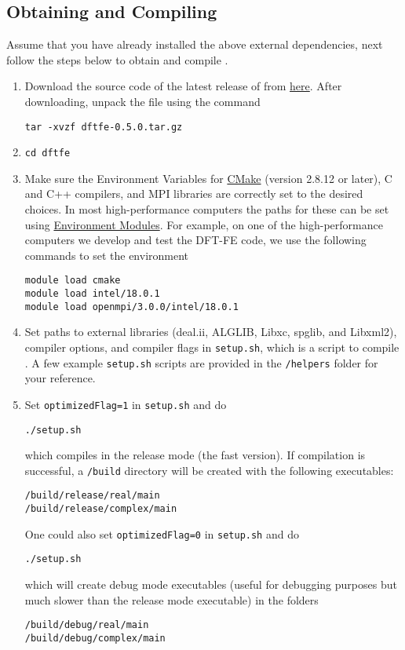 \subsection{Obtaining and Compiling \dftfe{}}
Assume that you have already installed the above external dependencies, next follow the steps below to obtain and compile \dftfe{}.
\begin{enumerate}
\item Download the source code of the latest release of \dftfe{} from \href{wesbite}{here}. After downloading, unpack the file using the command
\begin{verbatim}
tar -xvzf dftfe-0.5.0.tar.gz
\end{verbatim}

\item   \begin{verbatim}
cd dftfe
\end{verbatim}


\item Make sure the Environment Variables for \href{http://www.cmake.org/}{CMake} (version 2.8.12 or later), C and C++ compilers, and MPI libraries are correctly set to the desired choices. In most high-performance computers the paths for these can be set using \href{http://modules.sourceforge.net/}{Environment Modules}. For example, on one of the high-performance computers we develop and test the DFT-FE code, we use the following commands to set the environment
\begin{verbatim}
module load cmake
module load intel/18.0.1
module load openmpi/3.0.0/intel/18.0.1
\end{verbatim}

\item Set paths to external libraries (deal.ii, ALGLIB, Libxc, spglib, and Libxml2), compiler options, and compiler flags in \verb|setup.sh|, which is a script to compile \dftfe{}. A few example \verb|setup.sh| scripts are provided in the \verb|/helpers| folder for your reference. 

\item Set \verb|optimizedFlag=1| in \verb|setup.sh| and do
\begin{verbatim}
./setup.sh
\end{verbatim} 
which compiles \dftfe{} in the release mode (the fast version). If compilation is successful, a \verb|/build| directory will be created with the following executables:
\begin{verbatim}
/build/release/real/main
/build/release/complex/main
\end{verbatim}
One could also set \verb|optimizedFlag=0| in \verb|setup.sh| and do
\begin{verbatim}
./setup.sh
\end{verbatim}
which will create debug mode executables (useful for debugging purposes but much slower than the release mode executable) in the folders
\begin{verbatim}
/build/debug/real/main
/build/debug/complex/main
\end{verbatim}
\end{enumerate}
